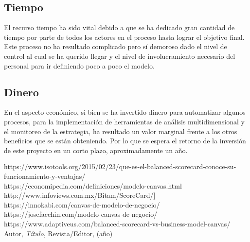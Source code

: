 \subsection{Tiempo}
\item {El recurso tiempo ha sido vital debido a que se ha dedicado gran cantidad de tiempo por parte de todos los actores en el proceso hasta lograr el objetivo final. Este proceso no ha resultado complicado pero sí demoroso dado el nivel de control al cual se ha querido llegar y el nivel de involucramiento necesario del personal para ir definiendo poco a poco el modelo.}

\subsection{Dinero}
\item {En el aspecto económico, si bien se ha invertido dinero para automatizar algunos procesos, para la implementación de herramientas de análisis multidimensional y el monitoreo de la estrategia, ha resultado un valor marginal frente a los otros beneficios que se están obteniendo. Por lo que se espera el retorno de la inversión de este proyecto en un corto plazo, aproximadamente un año.}

\newpage
\begin{thebibliography}{99}
https://www.isotools.org/2015/02/23/que-es-el-balanced-scorecard-conoce-su-funcionamiento-y-ventajas/\\
https://economipedia.com/definiciones/modelo-canvas.html\\
http://www.infoviews.com.mx/Bitam/ScoreCard/]\\
https://innokabi.com/canvas-de-modelo-de-negocio/\\
https://josefacchin.com/modelo-canvas-de-negocio/\\
https://www.adaptiveus.com/balanced-scorecard-vs-business-model-canvas/\\

 Autor, \emph{Título}, Revista/Editor, (año)

\end{thebibliography}


